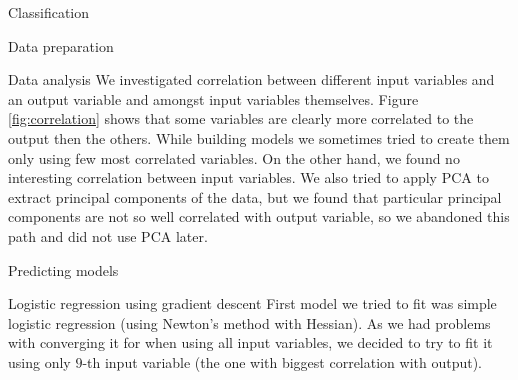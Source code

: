 \documentclass{article}
\begin{document}
\begin{section}{Classification}
\begin{subsection}{Data preparation}
\end{subsection}
\begin{subsection}{Data analysis}
We investigated correlation between different input variables and an output variable and amongst input variables themselves. Figure \ref{fig:correlation} shows that some variables are clearly more correlated to the output then the others. While building models we sometimes tried to create them only using few most correlated variables. On the other hand, we found no interesting correlation between input variables. We also tried to apply PCA to extract principal components of the data, but we found that particular principal components are not so well correlated with output variable, so we abandoned this path and did not use PCA later.

\begin{figure}[!t]
\center
{}
\hfill
{}
\caption{}
\end{figure}

\end{subsection}
\begin{subsection}{Predicting models}
\begin{subsubsection}{Logistic regression using gradient descent}
First model we tried to fit was simple logistic regression (using Newton's method with Hessian). As we had problems with converging it for when using all input variables, we decided to try to fit it using only $9$-th input variable (the one with biggest correlation with output). 


\end{subsubsection}
\end{subsection}
\end{section}
\end{document}
